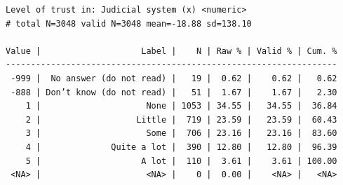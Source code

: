 \documentclass[
  letterpaper,
  DIV=11,
  numbers=noendperiod]{scrreprt}
\begin{document}
\begin{verbatim}
Level of trust in: Judicial system (x) <numeric> 
# total N=3048 valid N=3048 mean=-18.88 sd=138.10

Value |                    Label |    N | Raw % | Valid % | Cum. %
------------------------------------------------------------------
 -999 |  No answer (do not read) |   19 |  0.62 |    0.62 |   0.62
 -888 | Don’t know (do not read) |   51 |  1.67 |    1.67 |   2.30
    1 |                     None | 1053 | 34.55 |   34.55 |  36.84
    2 |                   Little |  719 | 23.59 |   23.59 |  60.43
    3 |                     Some |  706 | 23.16 |   23.16 |  83.60
    4 |              Quite a lot |  390 | 12.80 |   12.80 |  96.39
    5 |                    A lot |  110 |  3.61 |    3.61 | 100.00
 <NA> |                     <NA> |    0 |  0.00 |    <NA> |   <NA>
\end{verbatim}
\end{document}
